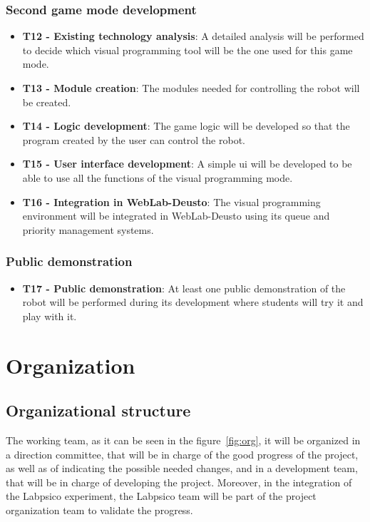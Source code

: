 \subsubsection{Second game mode development}

\begin{itemize}
\item \textbf{T12 - Existing technology analysis}: A detailed analysis will be performed to decide
which visual programming tool will be the one used for this game mode.

\item \textbf{T13 - Module creation}: The modules needed for controlling the robot will be created.

\item \textbf{T14 - Logic development}: The game logic will be developed so that the program created
by the user can control the robot.

\item \textbf{T15 - User interface development}: A simple \acrlong{ui} will be developed to be able
to use all the functions of the visual programming mode.

\item \textbf{T16 - Integration in WebLab-Deusto}: The visual programming environment will be
integrated in WebLab-Deusto using its queue and priority management systems.
\end{itemize}

\subsubsection{Public demonstration}

\begin{itemize}
\item \textbf{T17 - Public demonstration}: At least one public demonstration of the robot will be
performed during its development where students will try it and play with it.
\end{itemize}

\section{Organization}

\subsection{Organizational structure}

The working team, as it can be seen in the figure~\ref{fig:org}, it will be organized in a direction
committee, that will be in charge of the good progress of the project, as well as of indicating
the possible needed changes, and in a development team, that will be in charge of developing the
project. Moreover, in the integration of the Labpsico experiment, the Labpsico team will be part of
the project organization team to validate the progress.

